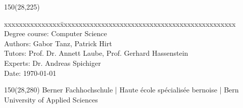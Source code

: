\begin{titlepage}
\begin{flushleft}
\begin{textblock}{150}(28,225)
\fontsize{10pt}{17pt}\selectfont
\begin{tabbing}
xxxxxxxxxxxxxxx\=xxxxxxxxxxxxxxxxxxxxxxxxxxxxxxxxxxxxxxxxxxxxxxx \kill
Degree course:	\> 	Computer Science \\		%
Authors:		\> 	Gabor Tanz, Patrick Hirt	\\					%
Tutors:	\> Prof. Dr. Annett Laube, Prof. Gerhard Hassenstein		\\							%
Experts:		\> Dr. Andreas Spichiger				\\							%
Date:			\> \today					\\							%
\end{tabbing}

\end{textblock}
\end{flushleft}

\begin{textblock}{150}(28,280)
\noindent 
\color{bfhgrey}\fontsize{9pt}{10pt}\selectfont
Berner Fachhochschule | Haute \'ecole sp\'ecialis\'ee bernoise | Bern University of Applied Sciences
\color{black}\selectfont
\end{textblock}


\end{titlepage}

%
%

